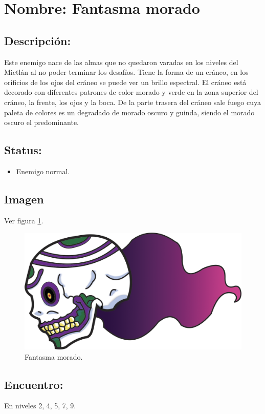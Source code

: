 \section{Nombre: Fantasma morado}   \label{per:fantasmaM}
\subsection{Descripción:}
Este enemigo nace de las almas que no quedaron varadas en los niveles del Mictlán al no poder terminar los desafíos. Tiene la forma de un cráneo, en los orificios de los ojos del cráneo se puede ver un brillo espectral. El cráneo está decorado con diferentes patrones de color morado y verde en la zona superior del cráneo, la frente, los ojos y la boca. De la parte trasera del cráneo sale fuego cuya paleta de colores es un degradado de morado oscuro y guinda, siendo el morado oscuro el predominante.  
\subsection{Status:}
\begin{itemize}
	\item Enemigo normal.
\end{itemize}
\subsection{Imagen}
Ver figura \ref{fig:fantasmaM}.
\begin{figure}
	\centering
	\includegraphics[height=0.2 \textheight]{Imagenes/fantasmaMorado}
	\caption{Fantasma morado.}
	\label{fig:fantasmaM}
\end{figure}
\subsection{Encuentro:}
En niveles 2, 4, 5, 7, 9.
